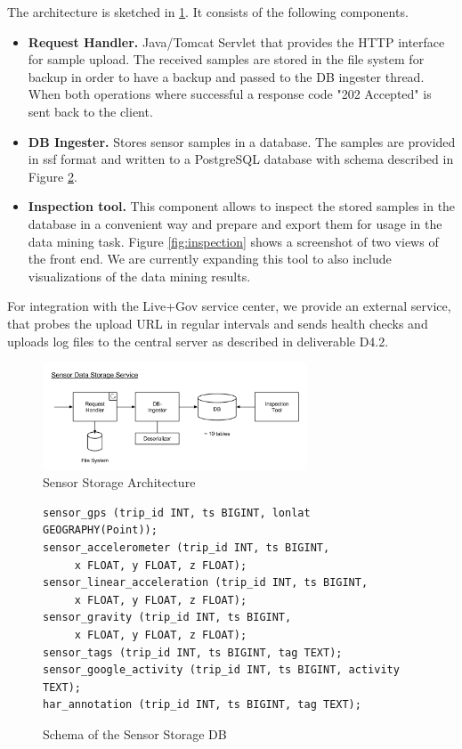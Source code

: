 The architecture is sketched in \ref{fig:ss_architecture}. It consists
of the following components.
\begin{itemize}
\item {\bf Request Handler.} Java/Tomcat Servlet that provides the
  HTTP interface for sample upload. The received samples are stored in
  the file system for backup in order to have a backup and passed to
  the DB ingester thread. When both operations where successful a
  response code "202 Accepted" is sent back to the client.
\item {\bf DB Ingester.} Stores sensor samples in a database. 
  The samples are provided in ssf format and written to a PostgreSQL
  database with schema described in Figure \ref{fig:db_scheme}.
\item {\bf Inspection tool.} This component allows to inspect the
  stored samples in the database in a convenient way and prepare and
  export them for usage in the data mining task. Figure
  \ref{fig:inspection} shows a screenshot of two views of the front
  end. We are currently expanding this tool to also include
  visualizations of the data mining results.
\end{itemize}

For integration with the Live+Gov service center, we provide an
external service, that probes the upload URL in regular intervals and
sends health checks and uploads log files to the central server as
described in deliverable D4.2.

\begin{figure}
\centering
\includegraphics[width=0.7\textwidth]{img/sc/ss_architecture.png}
\caption{Sensor Storage Architecture}\label{fig:ss_architecture}
\end{figure}

\begin{figure}
{\small
\begin{verbatim}
sensor_gps (trip_id INT, ts BIGINT, lonlat GEOGRAPHY(Point));
sensor_accelerometer (trip_id INT, ts BIGINT, 
     x FLOAT, y FLOAT, z FLOAT);
sensor_linear_acceleration (trip_id INT, ts BIGINT,
     x FLOAT, y FLOAT, z FLOAT);
sensor_gravity (trip_id INT, ts BIGINT, 
     x FLOAT, y FLOAT, z FLOAT);
sensor_tags (trip_id INT, ts BIGINT, tag TEXT);
sensor_google_activity (trip_id INT, ts BIGINT, activity TEXT);
har_annotation (trip_id INT, ts BIGINT, tag TEXT);
\end{verbatim}}
\label{fig:db_scheme}
\caption{Schema of the Sensor Storage DB}
\end{figure}

